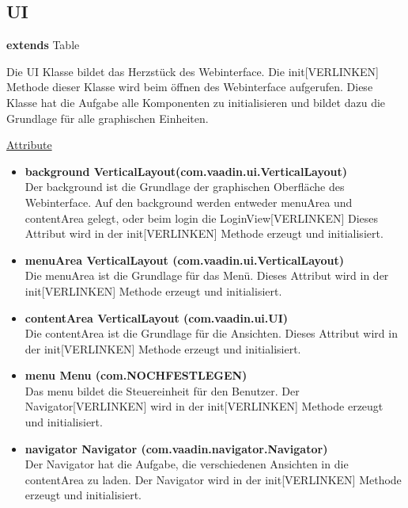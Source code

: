 \newpage
\subsection{UI}
\textbf{extends}  Table \newline

Die UI Klasse bildet das Herzstück des Webinterface. Die init[VERLINKEN] Methode dieser Klasse wird beim öffnen des Webinterface aufgerufen. Diese Klasse hat die Aufgabe alle Komponenten zu initialisieren und bildet dazu die Grundlage für alle graphischen Einheiten.

\underline{Attribute}
\begin{itemize}
\itemsep0pt

\item \textbf{background VerticalLayout(com.vaadin.ui.VerticalLayout)} \hfill\\ 
Der background ist die Grundlage der graphischen Oberfläche des Webinterface. Auf den background werden entweder menuArea und contentArea gelegt, oder beim login die LoginView[VERLINKEN] Dieses Attribut wird in der init[VERLINKEN] Methode erzeugt und initialisiert.

\item \textbf{menuArea VerticalLayout (com.vaadin.ui.VerticalLayout)} \hfill\\ 
Die menuArea ist die Grundlage für das Menü. Dieses Attribut wird in der init[VERLINKEN] Methode erzeugt und initialisiert.

\item \textbf{contentArea VerticalLayout (com.vaadin.ui.UI)} \hfill\\ 
Die contentArea ist die Grundlage für die Ansichten. Dieses Attribut wird in der init[VERLINKEN] Methode erzeugt und initialisiert.

\item \textbf{menu Menu (com.NOCHFESTLEGEN)} \hfill\\ 
Das menu bildet die Steuereinheit für den Benutzer. Der Navigator[VERLINKEN] wird in der init[VERLINKEN] Methode erzeugt und initialisiert.

\item \textbf{navigator Navigator (com.vaadin.navigator.Navigator)} \hfill\\ 
Der Navigator hat die Aufgabe, die verschiedenen Ansichten in die contentArea zu laden. Der Navigator wird in der init[VERLINKEN] Methode erzeugt und initialisiert.

\end{itemize}

